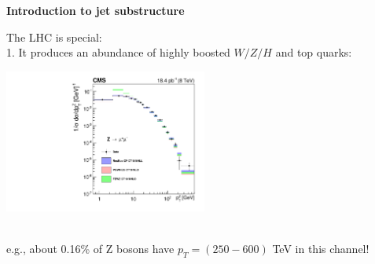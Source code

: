 \documentclass[9pt,a4paper,unknownkeysallowed,xcolor=dvipsnames,aspectratio=43]{beamer}
\begin{document}
\begin{frame}{\bf\huge Introduction to jet substructure}

{\color{red}The LHC is special:}\\
\vspace{2mm}
1. It produces an abundance of highly boosted $W/Z/H$ and top quarks:
\vspace{2mm}
\begin{center}
\includegraphics[width=0.5\textwidth]{05/cms_Z.pdf}\\\\\vspace{2mm}

e.g., about 0.16\% of Z bosons have $p_T = (250-600)$ TeV in this channel!
\end{center}
\end{frame}
%
%
%
\end{document}
